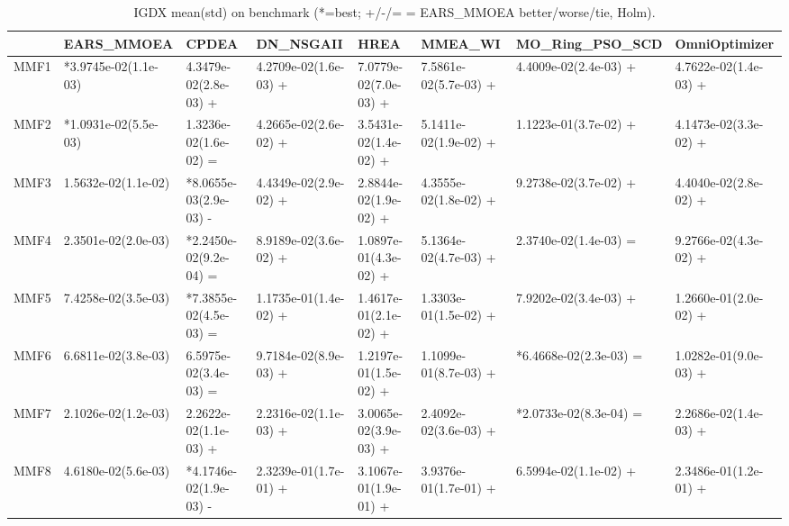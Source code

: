 \begin{table}[t]
\centering
\caption{IGDX mean(std) on benchmark (*=best; +/-/= = EARS_MMOEA better/worse/tie, Holm).}
\label{tab:benchmark_IGDX}
\begin{tabular}{llllllll}
\toprule
 & EARS\_MMOEA & CPDEA & DN\_NSGAII & HREA & MMEA\_WI & MO\_Ring\_PSO\_SCD & OmniOptimizer \\
\midrule
MMF1 & *3.9745e-02(1.1e-03) & 4.3479e-02(2.8e-03) + & 4.2709e-02(1.6e-03) + & 7.0779e-02(7.0e-03) + & 7.5861e-02(5.7e-03) + & 4.4009e-02(2.4e-03) + & 4.7622e-02(1.4e-03) + \\
MMF2 & *1.0931e-02(5.5e-03) & 1.3236e-02(1.6e-02) = & 4.2665e-02(2.6e-02) + & 3.5431e-02(1.4e-02) + & 5.1411e-02(1.9e-02) + & 1.1223e-01(3.7e-02) + & 4.1473e-02(3.3e-02) + \\
MMF3 & 1.5632e-02(1.1e-02) & *8.0655e-03(2.9e-03) - & 4.4349e-02(2.9e-02) + & 2.8844e-02(1.9e-02) + & 4.3555e-02(1.8e-02) + & 9.2738e-02(3.7e-02) + & 4.4040e-02(2.8e-02) + \\
MMF4 & 2.3501e-02(2.0e-03) & *2.2450e-02(9.2e-04) = & 8.9189e-02(3.6e-02) + & 1.0897e-01(4.3e-02) + & 5.1364e-02(4.7e-03) + & 2.3740e-02(1.4e-03) = & 9.2766e-02(4.3e-02) + \\
MMF5 & 7.4258e-02(3.5e-03) & *7.3855e-02(4.5e-03) = & 1.1735e-01(1.4e-02) + & 1.4617e-01(2.1e-02) + & 1.3303e-01(1.5e-02) + & 7.9202e-02(3.4e-03) + & 1.2660e-01(2.0e-02) + \\
MMF6 & 6.6811e-02(3.8e-03) & 6.5975e-02(3.4e-03) = & 9.7184e-02(8.9e-03) + & 1.2197e-01(1.5e-02) + & 1.1099e-01(8.7e-03) + & *6.4668e-02(2.3e-03) = & 1.0282e-01(9.0e-03) + \\
MMF7 & 2.1026e-02(1.2e-03) & 2.2622e-02(1.1e-03) + & 2.2316e-02(1.1e-03) + & 3.0065e-02(3.9e-03) + & 2.4092e-02(3.6e-03) + & *2.0733e-02(8.3e-04) = & 2.2686e-02(1.4e-03) + \\
MMF8 & 4.6180e-02(5.6e-03) & *4.1746e-02(1.9e-03) - & 2.3239e-01(1.7e-01) + & 3.1067e-01(1.9e-01) + & 3.9376e-01(1.7e-01) + & 6.5994e-02(1.1e-02) + & 2.3486e-01(1.2e-01) + \\
\bottomrule
\end{tabular}
\end{table}
